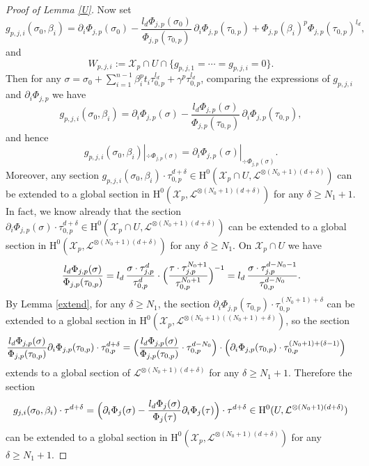 \documentclass[11pt]{article}
\numberwithin{equation}{section}
\theoremstyle{plain}
\theoremstyle{definition}
\newcommand{\ho}{\mathrm{H}}
\newcommand{\X}{\mathcal{X}}
\newcommand{\li}{\mathcal{L}}
\begin{document}
\begin{proof}[Proof of Lemma \ref{U}]
Now set\vspace*{-3pt}
\[
g_{p, j,i}(\sigma_0,\beta_i)=\partial_i \Phi_{j,p}(\sigma_0)-\frac{l_d\Phi_{j,p}(\sigma_0)}{\Phi_{j,p}(\tau_{0,p})}\, \partial_i\Phi_{j,p}(\tau_{0,p})+\Phi_{j,p}(\beta_i)^p\Phi_{j,p}(\tau_{0,p})^{l_d},
\]
and\vspace*{-3pt}
\[
W_{p,j,i}:=\X_p\cap U\cap \{ g_{p,j,1}=\cdots=g_{p,j,i}=0 \}.
\]
Then for any $\sigma=\sigma_0+\sum_{i=1}^{n-1} \beta_i^pt_i\tau_{0,p}^{l_d}+\gamma^p\tau_{0,p}^{l_d}$, comparing the expressions of $g_{p,j,i}$ and $\partial_i\Phi_{j,p}$ we have\vspace*{-7pt}
\[
g_{p,j,i}(\sigma_0,\beta_i)=\partial_i\Phi_{j,p}(\sigma)-\frac{l_d\Phi_{j,p}(\sigma)}{\Phi_{j,p}(\tau_{0,p})}\,\partial_i\Phi_{j,p}(\tau_{0,p}),
\]
and hence\vspace*{-3pt}
\[
g_{p,j,i}(\sigma_0,\beta_i)|_{ \div \Phi_{j,p}(\sigma)}=\partial_i\Phi_{j,p}(\sigma)|_{ \div \Phi_{j,p}(\sigma)}.
\]
Moreover, any section $g_{p,j,i}(\sigma_0,\beta_i)\cdot \tau_{0,p}^{d+\delta}\in \ho^0(\X_p\cap U, \li^{\otimes (N_0+1)(d+\delta)})$ can be extended to a global section in $\ho^0(\X_p, \li^{\otimes (N_0+1)(d+\delta)})$ for any $\delta\geq N_1+1$. In fact, we know already that the section $\partial_i\Phi_{j,p}(\sigma)\cdot \tau_{0,p}^{d+\delta}\in \ho^0(\X_p\cap U, \li^{\otimes (N_0+1)(d+\delta)})$ can be extended to a global section in $\ho^0(\X_p, \li^{\otimes (N_0+1)(d+\delta)})$ for any $\delta\geq N_1$. On $\X_p\cap U$ we have
\[
\frac{l_d\Phi_{j,p}(\sigma)}{\Phi_{j,p}(\tau_{0,p})}= l_d\,\frac{\sigma \cdot \tau_{j,p}^d}{\tau_{0,p}^d} \cdot\Bigl(\frac{\tau \cdot \tau_{j,p}^{N_0+1}}{\tau_{0,p}^{N_0+1}}\Bigr)^{-1}=l_d\,\frac{\sigma \cdot \tau_{j,p}^{d-N_0-1}}{\tau_{0,p}^{d-N_0}}.
\]
By Lemma \ref{extend}, for any $\delta\geq N_1$, the section $ \partial_i\Phi_{j,p}(\tau_{0,p}) \cdot \tau_{0,p}^{(N_0+1)+\delta}$ can be extended to a global section in $\ho^0(\X_p, \li^{\otimes (N_0+1)((N_0+1)+\delta)})$, so the section
\begin{align*}
\frac{l_d\Phi_{j,p}(\sigma)}{\Phi_{j,p}(\tau_{0,p})} \partial_i\Phi_{j,p}(\tau_{0,p})\cdot \tau_{0,p}^{d+\delta} &= \Bigl(\frac{l_d\Phi_{j,p}(\sigma)}{\Phi_{j,p}(\tau_{0,p})}\cdot \tau_{0,p}^{d-N_0}\Bigr)\cdot \left(\partial_i\Phi_{j,p}(\tau_{0,p}) \cdot \tau_{0,p}^{(N_0+1)+(\delta-1)} \right)
\end{align*}
extends to a global section of $\li^{\otimes (N_0+1)(d+\delta)}$ for any $\delta \geq N_1+1$.
Therefore the section
\[
g_{j,i}(\sigma_0,\beta_i)\cdot \tau^{d+\delta}=\Bigl(\partial_i\Phi_{j}(\sigma)-\frac{l_d\Phi_j(\sigma)}{\Phi_j(\tau)}\partial_i\Phi_j(\tau)\Bigr)\cdot \tau^{d+\delta}\in \ho^0(U, \li^{\otimes (N_0+1)(d+\delta)})
\]
can be extended to a global section in $\ho^0(\X_p, \li^{\otimes (N_0+1)(d+\delta)})$ for any $\delta\geq N_1+1$.


\end{proof}
\end{document}
